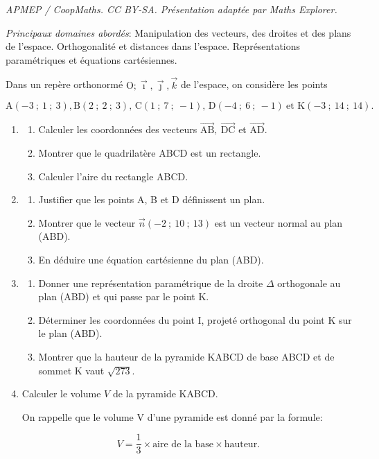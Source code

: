 \documentclass[10pt]{article}
\providecommand{\vect}[1]{\overrightarrow{#1}}
\providecommand{\Oijk}{\(\mathrm{O};\vec{\imath},\vec{\jmath},\vec{k}\)}
\begin{document}
\noindent\textit{APMEP / CoopMaths. CC BY-SA. Présentation adaptée par Maths Explorer.}\par\medskip
\medskip

\emph{Principaux domaines abordés}: Manipulation des vecteurs, des droites et des plans de l'espace. Orthogonalité et distances dans l'espace.
Représentations paramétriques et équations cartésiennes.

\bigskip

Dans un repère orthonormé \Oijk{} de l'espace,
on considère les points 

\[\text{A}(-3~;~1~;~3), \text{B}(2~;~2~;~3),\, \text{C}(1~;~7~;~-1), \,\text{D}(-4~;~6~;~-1)\: \text{et 
K}(-3~;~14~;~14).\]

\medskip

\begin{enumerate}
\item 
	\begin{enumerate}
		\item Calculer les coordonnées des vecteurs $\vect{\text{AB}},\: \vect{\text{DC}}$ et 
		$\vect{\text{AD}}$.
		\item Montrer que le quadrilatère ABCD est un rectangle.
		\item Calculer l'aire du rectangle ABCD.
	\end{enumerate}
\item 
	\begin{enumerate}
		\item Justifier que les points A, B et D définissent un plan.
		\item Montrer que le vecteur $\vect{n}(-2~;~10~;~13)$ est un vecteur normal au plan (ABD). 
		\item  En déduire une équation cartésienne du plan (ABD).
	\end{enumerate}
\item
	\begin{enumerate}
		\item Donner une représentation paramétrique de la droite $\Delta$ orthogonale au plan (ABD) et qui passe par le point K.
		\item Déterminer les coordonnées du point I, projeté orthogonal du point K sur le plan (ABD).
		\item Montrer que la hauteur de la pyramide KABCD de base ABCD et de sommet K
vaut $\sqrt{273}$.
	\end{enumerate}
\item Calculer le volume $V$ de la pyramide KABCD.

On rappelle que le volume V d'une pyramide est donné par la formule:

\[V= \dfrac13 \times \text{aire de la base} \times \text{hauteur}.\]
\end{enumerate}
\end{document}
